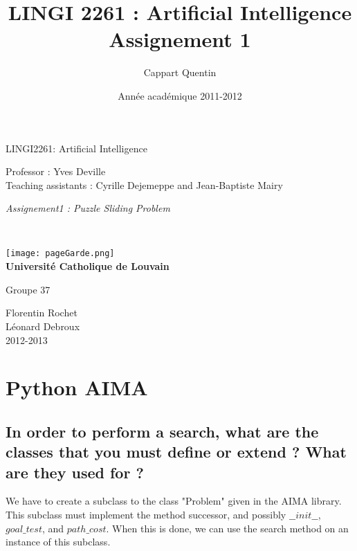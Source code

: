 \documentclass[a4paper,10pt]{article}
\title{LINGI 2261 : Artificial Intelligence \\
Assignement 1}
\author{Cappart Quentin}
\date{Année académique 2011-2012}
\begin{document}
	\begin{titlepage}
		\begin{center}
			{\huge LINGI2261: Artificial Intelligence}\\
			\vspace{0.4cm}
			
			{\Large {Professor : Yves Deville\\ \vspace{0.2cm} Teaching assistants : Cyrille Dejemeppe and Jean-Baptiste Mairy  }}\\
			\vspace{0.6cm}
			
			{\Large \textit{ Assignement1 : Puzzle Sliding Problem}}\\
			\vspace{1.2cm}

			\texttt{}\\
			\vspace{0.2cm}

			\texttt{[image: pageGarde.png]}\\
			\vspace{0.1cm}
			{\Large \textbf{Universit\'e Catholique de Louvain}}
			\vspace{0.7cm}

			Groupe 37 \\
			\vspace{0.2cm}
			
			Florentin Rochet \\
			Léonard Debroux\\
			\vspace{0.2cm}
			2012-2013\\
		\end{center}
	\end{titlepage}

	\newpage
	
	\section{Python AIMA}
	
	\subsection{In order to perform a search, what are the classes that you must define or extend ? What are they used for ?}
	We have to create a subclass to the class "Problem" given in the AIMA library. This subclass must implement the method successor, and possibly $ \_\_init\_\_$, $goal\_test$, and $path\_cost$. When this is done, we can use the search method on an instance of this subclass.
\end{document}
